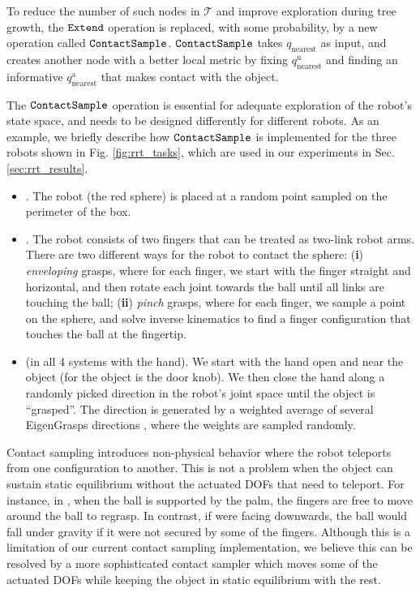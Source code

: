 To reduce the number of such nodes in $\mathcal{T}$ and improve exploration during tree growth, the $\mathtt{Extend}$ operation is replaced, with some probability, by a new operation called $\mathtt{ContactSample}$. $\mathtt{ContactSample}$ takes $q_\mathrm{nearest}$ as input, and creates another node with a better local metric by fixing $q_\mathrm{nearest}^\mathrm{u}$ and finding an informative $q_\mathrm{nearest}^\mathrm{a}$ that makes contact with the object. 

The $\mathtt{ContactSample}$ operation is essential for adequate exploration of the robot's state space, and needs to be designed differently for different robots. 
As an example, we briefly describe how $\mathtt{ContactSample}$ is implemented for the three robots shown in Fig. \ref{fig:rrt_tasks}, which are used in our experiments in Sec. \ref{sec:rrt_results}. 
\begin{itemize}
\item {}. The robot (the red sphere) is placed at a random point sampled on the perimeter of the box. 
\item {}. The robot consists of two fingers that can be treated as two-link robot arms. There are two different ways for the robot to contact the sphere: 
(\textbf{i}) \emph{enveloping} grasps, where for each finger, we start with the finger straight and horizontal, and then rotate each joint towards the ball until all links are touching the ball; 
(\textbf{ii}) \emph{pinch} grasps, where for each finger, we sample a point on the sphere, and solve inverse kinematics to find a finger configuration that touches the ball at the fingertip. 
\item {} (in all 4 systems with the hand). We start with the hand open and near the object (for  the object is the door knob). We then close the hand along a randomly picked direction in the robot's joint space until the object is ``grasped''.  The direction is generated by a weighted average of several EigenGrasps directions \cite{eigengrasp}, where the weights are sampled randomly. 
\end{itemize}  

Contact sampling introduces non-physical behavior where the robot teleports from one configuration to another. This is not a problem when the object can sustain static equilibrium without the actuated DOFs that need to teleport. For instance, in , when the ball is supported by the palm, the fingers are free to move around the ball to regrasp. In contrast, if  were facing downwards, the ball would fall under gravity if it were not secured by some of the fingers. Although this is a limitation of our current contact sampling implementation, we believe this can be resolved by a more sophisticated contact sampler which moves some of the actuated DOFs while keeping the object in static equilibrium with the rest. 

